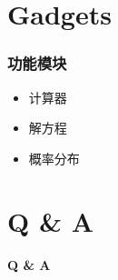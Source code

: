 \documentclass[dvipdfm,serif,mathserif]{beamer}
\begin{document}
\section{Gadgets}

\begin{frame}
  \frametitle{功能模块}
\begin{itemize}
\item 计算器
\item 解方程
\item 概率分布
\end{itemize}

\end{frame}
\section{Q \& A}
\begin{frame}
\begin{Huge}\begin{center}
            \textbf{  Q \& A}
             \end{center}\end{Huge}
\end{frame}
\end{document}
